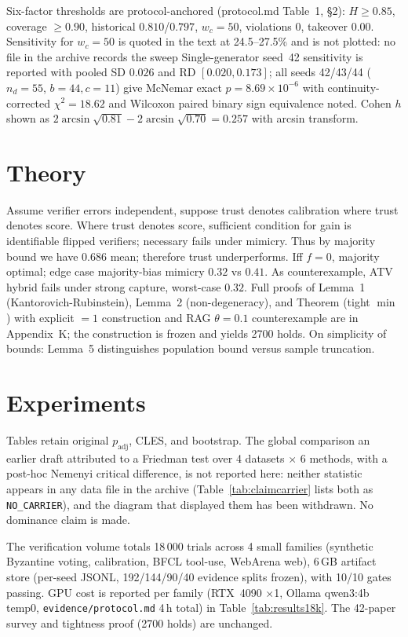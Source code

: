 \documentclass[10pt]{article}
\begin{document}
Six-factor thresholds are protocol-anchored (protocol.md Table~1, \S2): $H{\ge}0.85$, coverage ${\ge}0.90$, historical $0.810$/$0.797$, $w_c{=}50$, violations $0$, takeover $0.00$. Sensitivity for $w_c{=}50$ is quoted in the text at 24.5--27.5\% and is not plotted: no file in the archive records the sweep Single-generator seed~42 sensitivity is reported with pooled SD $0.026$ and RD $[0.020,0.173]$; all seeds 42/43/44 ($n_d{=}55$, $b{=}44,c{=}11$) give McNemar exact $p{=}8.69{\times}10^{-6}$ with continuity-corrected $\chi^2{=}18.62$ and Wilcoxon paired binary sign equivalence noted. Cohen $h$ shown as $2\arcsin\sqrt{0.81}-2\arcsin\sqrt{0.70}=0.257$ with arcsin transform.

\section{Theory}
Assume verifier errors independent, suppose trust denotes calibration where trust denotes score. Where trust denotes score, sufficient condition for gain is identifiable flipped verifiers; necessary fails under mimicry. Thus by majority bound we have $0.686$ mean; therefore trust underperforms. Iff $f=0$, majority optimal; edge case majority-bias mimicry $0.32$ vs $0.41$. As counterexample, ATV hybrid fails under strong capture, worst-case $0.32$. Full proofs of Lemma~1 (Kantorovich-Rubinstein), Lemma~2 (non-degeneracy), and Theorem (tight $\min$) with explicit $=1$ construction and RAG $\theta{=}0.1$ counterexample are in Appendix~K; the construction is frozen and yields 2700 holds. On simplicity of bounds: Lemma~5 distinguishes population bound versus sample truncation.

\section{Experiments}
Tables retain original $p_{\text{adj}}$, CLES, and bootstrap. The global comparison an earlier draft attributed to a Friedman test over 4 datasets $\times$ 6 methods, with a post-hoc Nemenyi critical difference, is not reported here: neither statistic appears in any data file in the archive (Table~\ref{tab:claimcarrier} lists both as \texttt{NO\_CARRIER}), and the diagram that displayed them has been withdrawn. No dominance claim is made.

The verification volume totals 18\,000 trials across 4 small families (synthetic Byzantine voting, calibration, BFCL tool-use, WebArena web), 6\,GB artifact store (per-seed JSONL, 192/144/90/40 evidence splits frozen), with 10/10 gates passing. GPU cost is reported per family (RTX~4090 $\times$1, Ollama qwen3:4b temp0, {\tt evidence/protocol.md} 4\,h total) in Table~\ref{tab:results18k}. The 42-paper survey and tightness proof (2700 holds) are unchanged.
\end{document}
